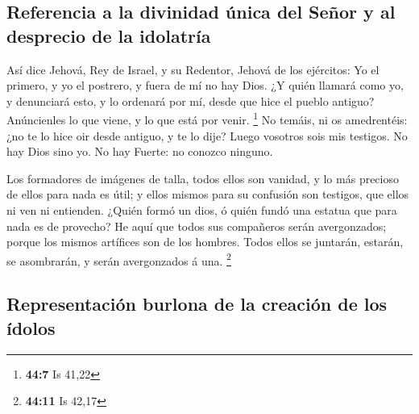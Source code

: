 \hypertarget{referencia-a-la-divinidad-uxfanica-del-seuxf1or-y-al-desprecio-de-la-idolatruxeda}{%
\subsection{Referencia a la divinidad única del Señor y al desprecio de
la
idolatría}\label{referencia-a-la-divinidad-uxfanica-del-seuxf1or-y-al-desprecio-de-la-idolatruxeda}}

 Así dice Jehová, Rey de Israel, y su Redentor, Jehová de
los ejércitos: Yo el primero, y yo el postrero, y fuera de mí no hay
Dios.  ¿Y quién llamará como yo, y denunciará esto, y lo
ordenará por mí, desde que hice el pueblo antiguo? Anúncienles lo que
viene, y lo que está por venir. \footnote{\textbf{44:7} Is 41,22}
 No temáis, ni os amedrentéis: ¿no te lo hice oir desde
antiguo, y te lo dije? Luego vosotros sois mis testigos. No hay Dios
sino yo. No hay Fuerte: no conozco ninguno.

 Los formadores de imágenes de talla, todos ellos son
vanidad, y lo más precioso de ellos para nada es útil; y ellos mismos
para su confusión son testigos, que ellos ni ven ni entienden.
 ¿Quién formó un dios, ó quién fundó una estatua que para
nada es de provecho?  He aquí que todos sus compañeros
serán avergonzados; porque los mismos artífices son de los hombres.
Todos ellos se juntarán, estarán, se asombrarán, y serán avergonzados á
una. \footnote{\textbf{44:11} Is 42,17}

\hypertarget{representaciuxf3n-burlona-de-la-creaciuxf3n-de-los-uxeddolos}{%
\subsection{Representación burlona de la creación de los
ídolos}\label{representaciuxf3n-burlona-de-la-creaciuxf3n-de-los-uxeddolos}}

